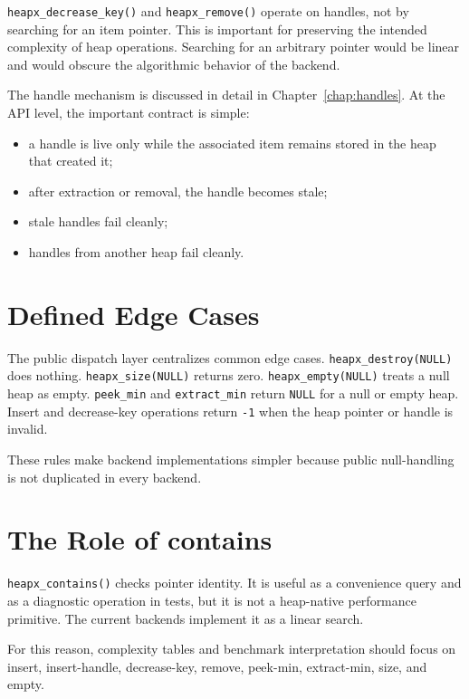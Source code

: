 \texttt{heapx\_decrease\_key()} and \texttt{heapx\_remove()} operate on handles, not by searching for an item pointer.
This is important for preserving the intended complexity of heap operations.
Searching for an arbitrary pointer would be linear and would obscure the algorithmic behavior of the backend.

The handle mechanism is discussed in detail in Chapter~\ref{chap:handles}.
At the API level, the important contract is simple:

\begin{itemize}
    \item a handle is live only while the associated item remains stored in the heap that created it;
    \item after extraction or removal, the handle becomes stale;
    \item stale handles fail cleanly;
    \item handles from another heap fail cleanly.
\end{itemize}

\section{Defined Edge Cases}

The public dispatch layer centralizes common edge cases.
\texttt{heapx\_destroy(NULL)} does nothing.
\texttt{heapx\_size(NULL)} returns zero.
\texttt{heapx\_empty(NULL)} treats a null heap as empty.
\texttt{peek\_min} and \texttt{extract\_min} return \texttt{NULL} for a null or empty heap.
Insert and decrease-key operations return \texttt{-1} when the heap pointer or handle is invalid.

These rules make backend implementations simpler because public null-handling is not duplicated in every backend.

\section{The Role of contains}

\texttt{heapx\_contains()} checks pointer identity.
It is useful as a convenience query and as a diagnostic operation in tests, but it is not a heap-native performance primitive.
The current backends implement it as a linear search.

For this reason, complexity tables and benchmark interpretation should focus on insert, insert-handle, decrease-key, remove, peek-min, extract-min, size, and empty.
